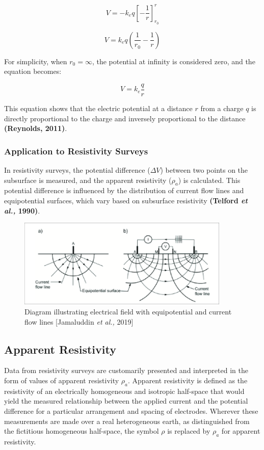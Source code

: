 \documentclass[12pt,a4paper]{report}
\begin{document}
\begin{equation}
V = - k_e q \left[ -\frac{1}{r} \right]_{r_0}^{r}
\end{equation}

\begin{equation}
V = k_e q \left( \frac{1}{r_0} - \frac{1}{r} \right)
\end{equation}

For simplicity, when \(r_0 = \infty\), the potential at infinity is considered zero, and the equation becomes:

\begin{equation}
V = k_e \frac{q}{r}
\end{equation}

This equation shows that the electric potential at a distance \(r\) from a charge \(q\) is directly proportional to the charge and inversely proportional to the distance \textbf{(Reynolds, 2011)}.

\subsubsection{Application to Resistivity Surveys}
In resistivity surveys, the potential difference (\(\Delta V\)) between two points on the subsurface is measured, and the apparent resistivity (\(\rho_a\)) is calculated. This potential difference is influenced by the distribution of current flow lines and equipotential surfaces, which vary based on subsurface resistivity \textbf{(Telford \textit{et al.,} 1990)}.

\begin{figure}[H]
    \centering
    \includegraphics[width=0.90\textwidth]{Simplified-current-flow-lines-and-equipotential-surfaces-arising-from-a-a-single.png}
    \caption{Diagram illustrating electrical field with equipotential and current flow lines [Jamaluddin \textit{et al.,} 2019]}
\end{figure}

\subsection{Apparent Resistivity}
Data from resistivity surveys are customarily presented and interpreted in the form of values of apparent resistivity \(\rho_a\). Apparent resistivity is defined as the resistivity of an electrically homogeneous and isotropic half-space that would yield the measured relationship between the applied current and the potential difference for a particular arrangement and spacing of electrodes. Wherever these measurements are made over a real heterogeneous earth, as distinguished from the fictitious homogeneous half-space, the symbol \(\rho\) is replaced by \(\rho_a\) for apparent resistivity.
\end{document}
